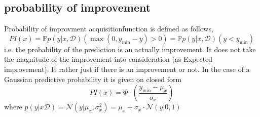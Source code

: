 





\subsection{probability of improvement}
Probability of improvment acquisitionfunction is defined as follows, 
$$PI(x) = \mathbb{P}{p(y|x,\mathcal{D})}(\max(0,y_{\min}-y)>0) =
\mathbb{P}{p(y|x,\mathcal{D})}(y<y_{\min})$$ i.e. the probability of the prediction is an actually
improvement. It does not take the magnitude of the improvement into consideration (as Expected
improvement). It rather just if there is an improvement or not. In the case of a Gaussian predictive
probability it is given on closed form
$$PI(x) = \Phi·\left(\frac{y_{\min}-\mu_x}{\sigma_x}\right)$$
where $p(y|x\mathcal{D}) =\mathcal{N}(y|\mu_x,\sigma_x^2) =\mu_x + \sigma_x\cdot\mathcal{N}(y|0,1)$




